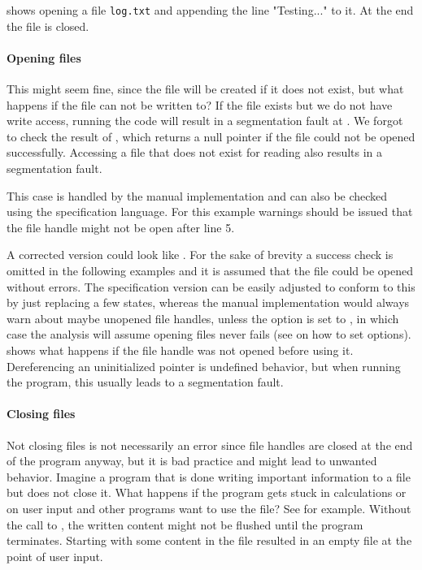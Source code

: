  shows opening a file \verb|log.txt| and appending the line "Testing..." to it. At the end the file is closed.

\paragraph*{Opening files}
This might seem fine, since the file will be created if it does not exist, but what happens if the file can not be written to?
If the file exists but we do not have write access, running the code will result in a segmentation fault at .
We forgot to check the result of , which returns a null pointer if the file could not be opened successfully.
Accessing a file that does not exist for reading also results in a segmentation fault.

This case is handled by the manual implementation and can also be checked using the specification language. For this example warnings should be issued that the file handle might not be open after line 5.

A corrected version could look like .
For the sake of brevity a success check is omitted in the following examples and it is assumed that the file could be opened without errors. The specification version can be easily adjusted to conform to this by just replacing a few states, whereas the manual implementation would always warn about maybe unopened file handles, unless the option  is set to , in which case the analysis will assume opening files never fails (see  on how to set options).
 shows what happens if the file handle was not opened before using it. Dereferencing an uninitialized pointer is undefined behavior, but when running the program, this usually leads to a segmentation fault.

\paragraph*{Closing files}
Not closing files is not necessarily an error since file handles are closed at the end of the program anyway, but it is bad practice and might lead to unwanted behavior.
Imagine a program that is done writing important information to a file but does not close it. What happens if the program gets stuck in calculations or on user input and other programs want to use the file? See  for example. Without the call to , the written content might not be flushed until the program terminates. Starting with some content in the file resulted in an empty file at the point of user input.


